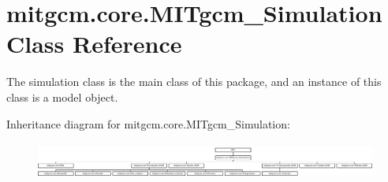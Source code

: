\hypertarget{classmitgcm_1_1core_1_1MITgcm__Simulation}{}\section{mitgcm.\+core.\+M\+I\+Tgcm\+\_\+\+Simulation Class Reference}
\label{classmitgcm_1_1core_1_1MITgcm__Simulation}


The simulation class is the main class of this package, and an instance of this class is a model object.  


Inheritance diagram for mitgcm.\+core.\+M\+I\+Tgcm\+\_\+\+Simulation\+:\begin{figure}[H]
\begin{center}
\leavevmode
\includegraphics[height=1.244444cm]{classmitgcm_1_1core_1_1MITgcm__Simulation}
\end{center}
\end{figure}
